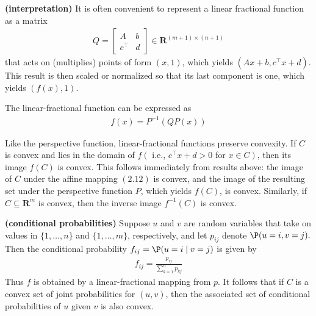 \documentclass{article}
\newcommand{\bfs}[1]{\textbf{({#1}) }}
\begin{document}
\begin{rema}{\bfs{interpretation}}
It is often convenient to represent a linear fractional function as a matrix
\begin{align*}
Q=\left[\begin{array}{cc}
A & b \\
c^{\top} & d
\end{array}\right] \in \mathbf{R}^{(m+1) \times(n+1)}
\end{align*}
that acts on (multiplies) points of form $(x, 1)$, which yields $\left(A x+b, c^{\top} x+d\right)$. This result is then scaled or normalized so that its last component is one, which yields $(f(x), 1)$.

The linear-fractional function can be expressed as
\begin{align*}
f(x)={P}^{-1}(Q {P}(x))
\end{align*}
\end{rema}

Like the perspective function, linear-fractional functions preserve convexity. If $C$ is convex and lies in the domain of $f\left(\right.$ i.e., $c^{\top} x+d>0$ for $\left.x \in C\right)$, then its image $f(C)$ is convex. This follows immediately from results above: the image of $C$ under the affine mapping $(2.12)$ is convex, and the image of the resulting set under the perspective function $P$, which yields $f(C)$, is convex. Similarly, if $C \subseteq \mathbf{R}^{m}$ is convex, then the inverse image $f^{-1}(C)$ is convex.

\begin{exma}{\bfs{conditional probabilities}}
Suppose $u$ and $v$ are random variables that take on values in $\{1, \ldots, n\}$ and $\{1, \ldots, m\}$, respectively, and let $p_{i j}$ denote $\P(u=i, v=j) .$ Then the conditional probability $f_{i j}=\P(u=i \mid v=j)$ is given by
\begin{align*}
f_{i j}=\frac{p_{i j}}{\sum_{k=1}^{n} p_{k j}}
\end{align*}
Thus $f$ is obtained by a linear-fractional mapping from $p$.
It follows that if $C$ is a convex set of joint probabilities for $(u, v)$, then the associated set of conditional probabilities of $u$ given $v$ is also convex.
\end{exma} 
\end{document}
